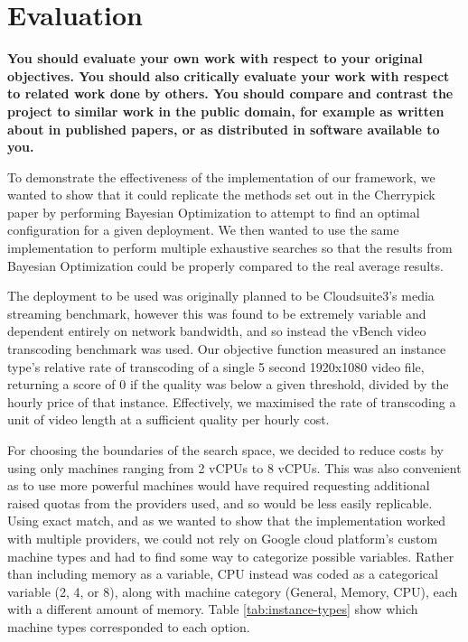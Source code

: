 \documentclass{article}
\begin{document}
\section{Evaluation}
\textbf{You should evaluate your own work with respect to your original objectives. You should also critically evaluate your work with respect to related work done by others. You should compare and contrast the project to similar work in the public domain, for example as written about in published papers, or as distributed in software available to you.}

To demonstrate the effectiveness of the implementation of our framework, we wanted to show that it could replicate the methods set out in the Cherrypick paper \cite{Alipourfard2017} by performing Bayesian Optimization to attempt to find an optimal configuration for a given deployment. We then wanted to use the same implementation to perform multiple exhaustive searches so that the results from Bayesian Optimization could be properly compared to the real average results. 

The deployment to be used was originally planned to be Cloudsuite3's media streaming benchmark, however this was found to be extremely variable and dependent entirely on network bandwidth, and so instead the vBench video transcoding benchmark was used. Our objective function measured an instance type's relative rate of transcoding of a single 5 second 1920x1080 video file, returning a score of 0 if the quality was below a given threshold, divided by the hourly price of that instance. Effectively, we maximised the rate of transcoding a unit of video length at a sufficient quality per hourly cost. 

For choosing the boundaries of the search space, we decided to reduce costs by using only machines ranging from 2 vCPUs to 8 vCPUs. This was also convenient as to use more powerful machines would have required requesting additional raised quotas from the providers used, and so would be less easily replicable. Using exact match, and as we wanted to show that the implementation worked with multiple providers, we could not rely on Google cloud platform's custom machine types and had to find some way to categorize possible variables. Rather than including memory as a variable, CPU instead was coded as a categorical variable (2, 4, or 8), along with machine category (General, Memory, CPU), each with a different amount of memory. Table \ref{tab:instance-types} show which machine types corresponded to each option. 
\end{document}
